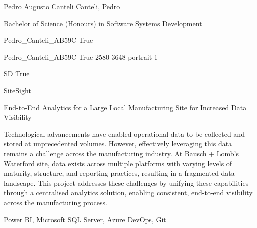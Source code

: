 
\begingroup{}\relax



\def\Key{Pedro_Canteli_AB59C}

{Pedro Augusto Canteli}
{Canteli, Pedro}

{Bachelor of Science (Honours) in Software Systems Development}

{Pedro_Canteli_AB59C}
{True}

{Pedro_Canteli_AB59C}
{True}
{2580}
{3648}
{portrait}
{1}

{SD}
{True}

{SiteSight}

{End-to-End Analytics for a Large Local Manufacturing Site for Increased Data Visibility}

{Technological advancements have enabled operational data to be collected and stored at unprecedented volumes. However, effectively leveraging this data remains a challenge across the manufacturing industry. At Bausch + Lomb's Waterford site, data exists across multiple platforms with varying levels of maturity, structure, and reporting practices, resulting in a fragmented data landscape. This project addresses these challenges by unifying these capabilities through a centralised analytics solution, enabling consistent, end-to-end visibility across the manufacturing process.}

{Power BI, Microsoft SQL Server, Azure DevOps, Git}


